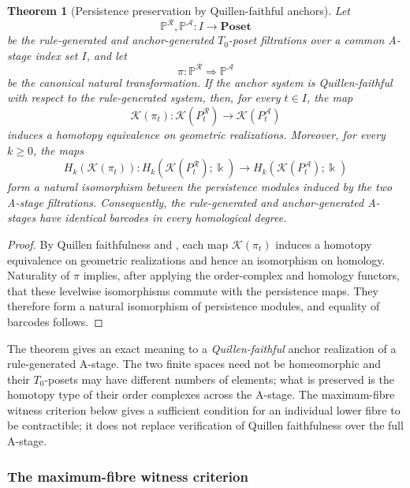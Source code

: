 \documentclass[a4paper,11pt]{article}
\newtheorem{theorem}{Theorem}[section]
\theoremstyle{definition}
\theoremstyle{remark}
\begin{document}
\begin{theorem}[Persistence preservation by Quillen-faithful anchors]
\label{thm:quillen-faithful-persistence}
Let
$$
\mathbb P^{\mathcal R},\mathbb P^{\mathcal A}\colon I\longrightarrow\mathbf{Poset}
$$
be the rule-generated and anchor-generated $T_0$-poset filtrations over a common A-stage index set $I$, and let
$$
\pi\colon\mathbb P^{\mathcal R}\Longrightarrow\mathbb P^{\mathcal A}
$$
be the canonical natural transformation.  If the anchor system is Quillen-faithful with respect to the rule-generated system, then, for every
$t\in I$, the map
$$
\mathcal K(\pi_t)\colon \mathcal K(P_t^{\mathcal R}) \longrightarrow \mathcal K(P_t^{\mathcal A})
$$
induces a homotopy equivalence on geometric realizations.  Moreover, for every
$k\geq0$, the maps
$$
H_k(\mathcal K(\pi_t))\colon H_k(\mathcal K(P_t^{\mathcal R});\Bbbk) \longrightarrow H_k(\mathcal K(P_t^{\mathcal A});\Bbbk)
$$
form a natural isomorphism between the persistence modules induced by the two A-stage filtrations.  Consequently, the rule-generated and anchor-generated A-stages have identical barcodes in every homological degree.
\end{theorem}

\begin{proof}
By Quillen faithfulness and , each map $\mathcal K(\pi_t)$ induces a homotopy equivalence on geometric realizations and hence an isomorphism on homology. Naturality of $\pi$ implies, after applying the order-complex and homology functors, that these levelwise isomorphisms commute with the persistence maps. They therefore form a natural isomorphism of persistence modules, and equality of barcodes follows.
\end{proof}

The theorem gives an exact meaning to a \emph{Quillen-faithful} anchor realization of a rule-generated A-stage. The two finite spaces need not be homeomorphic and their $T_0$-posets may have different numbers of elements; what is preserved is the homotopy type of their order complexes across the A-stage. The maximum-fibre witness criterion below gives a sufficient condition for an individual lower fibre to be contractible; it does not replace verification of Quillen faithfulness over the full A-stage.

\subsubsection*{The maximum-fibre witness criterion}
\end{document}
